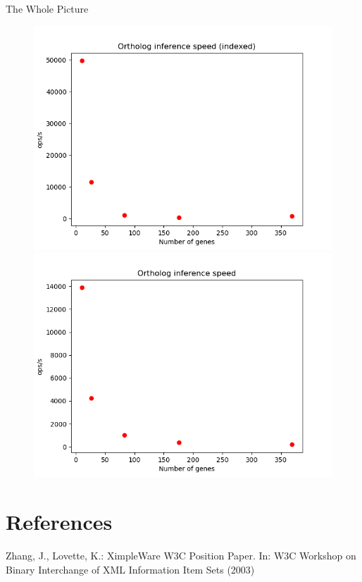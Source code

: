 \documentclass{beamer}
\begin{document}
\begin{frame}{The Whole Picture}
    \begin{figure}[htbp]
        \centering
        \includegraphics[width=0.45\linewidth]{res/ortholog_inference_performance_number_indexed copy.png}
        \includegraphics[width=0.45\linewidth]{res/ortholog_inference_performance_number.png}
    \end{figure}
\end{frame}

\section{References}

\begin{frame}
    \scriptsize

    Zhang, J., Lovette, K.: XimpleWare W3C Position Paper. In: W3C Workshop on Binary Interchange of XML Information Item Sets (2003)
\end{frame}
\end{document}

